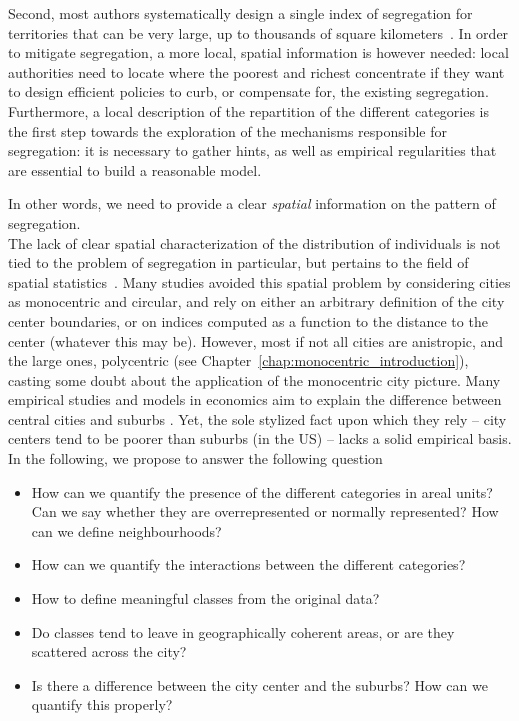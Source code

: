 Second, most authors systematically design a single index of segregation for
territories that can be very large, up to thousands of square
kilometers~\cite{Apparicio:2000}. In order to mitigate segregation, a more
local, spatial information is however needed: local authorities need to locate
where the poorest and richest concentrate if they want to design efficient
policies to curb, or compensate for, the existing segregation. Furthermore, 
a local description of the repartition of the different categories is the first
step towards the exploration of the mechanisms responsible for segregation: it
is necessary to gather hints, as well as empirical regularities that are
essential to build a reasonable model. 

In other words, we need to provide a clear {\it spatial} information on the
pattern of segregation.\\



The lack of clear spatial characterization of the distribution of individuals is
not tied to the problem of segregation in particular, but pertains to the field
of spatial statistics~\cite{Ripley:1981}. Many studies avoided this spatial
problem by considering cities as monocentric and circular, and rely on either an
arbitrary definition of the city center boundaries, or on indices computed as a
function to the distance to the center (whatever this may be). However, most if
not all cities are anistropic, and the large ones, polycentric
(see Chapter~\ref{chap:monocentric_introduction}), casting some doubt about
the application of the monocentric city picture. Many empirical studies and
models in economics aim to explain the difference between central cities and
suburbs \cite{Glaeser:2008, Brueckner:1999}. Yet, the sole stylized fact upon
which they rely -- city centers tend to be poorer than suburbs (in the US) --
lacks a solid empirical basis.\\

In the following, we propose to answer the following question

\begin{itemize}
    \item How can we quantify the presence of the different categories in areal
        units? Can we say whether they are overrepresented or normally
        represented? How can we define neighbourhoods?
    \item How can we quantify the interactions between the different categories?
    \item How to define meaningful classes from the original data?
    \item Do classes tend to leave in geographically coherent areas, or are they
        scattered across the city?
    \item Is there a difference between the city center and the suburbs? How
        can we quantify this properly?
\end{itemize}

